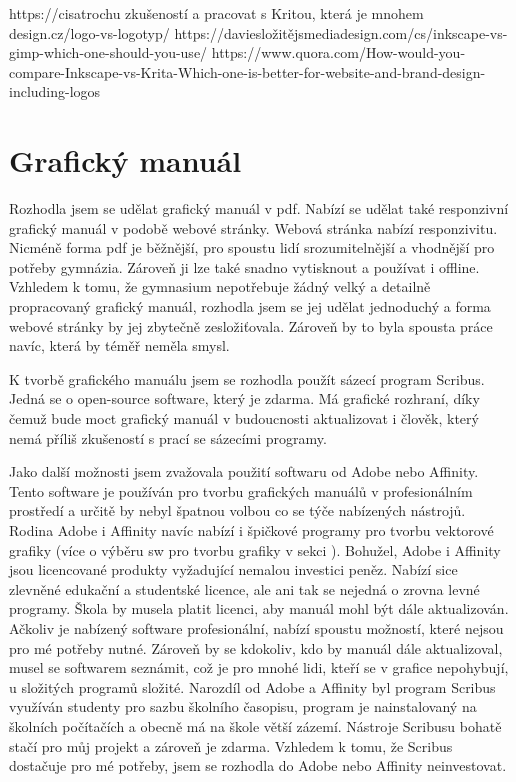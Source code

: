 \documentclass[11pt,a4paper,twoside,openright]{report}
\begin{document}
https://cisatrochu zkušeností a pracovat s Kritou, která je mnohem design.cz/logo-vs-logotyp/
https://daviesložitějsmediadesign.com/cs/inkscape-vs-gimp-which-one-should-you-use/
https://www.quora.com/How-would-you-compare-Inkscape-vs-Krita-Which-one-is-better-for-website-and-brand-design-including-logos

\section{Grafický manuál}
Rozhodla jsem se udělat grafický manuál v pdf. Nabízí se udělat také responzivní grafický manuál v podobě webové stránky. Webová stránka nabízí responzivitu. Nicméně forma pdf je běžnější, pro spoustu lidí srozumitelnější a vhodnější pro potřeby gymnázia. Zároveň ji lze také snadno vytisknout a používat i offline. Vzhledem k tomu, že gymnasium nepotřebuje žádný velký a detailně propracovaný grafický manuál, rozhodla jsem se jej udělat jednoduchý a forma webové stránky by jej zbytečně zesložiťovala. Zároveň by to byla spousta práce navíc, která by téměř neměla smysl.

\label{sec:manual}
K tvorbě grafického manuálu jsem se rozhodla použít sázecí program Scribus. Jedná se o open-source software, který je zdarma. Má grafické rozhraní, díky čemuž bude moct grafický manuál v budoucnosti aktualizovat i člověk, který nemá příliš zkušeností s prací se sázecími programy.

Jako další možnosti jsem zvažovala použití softwaru od Adobe nebo Affinity. Tento software je používán pro tvorbu grafických manuálů v profesionálním prostředí a určitě by nebyl špatnou volbou co se týče nabízených nástrojů. Rodina Adobe i Affinity navíc nabízí i špičkové programy pro tvorbu vektorové grafiky (více o výběru sw pro tvorbu grafiky v sekci ). Bohužel, Adobe i Affinity jsou licencované produkty vyžadující nemalou investici peněz. Nabízí sice zlevněné edukační a studentské licence, ale ani tak se nejedná o zrovna levné programy. Škola by musela platit licenci, aby manuál mohl být dále aktualizován. Ačkoliv je nabízený software profesionální, nabízí spoustu možností, které nejsou pro mé potřeby nutné. Zároveň by se kdokoliv, kdo by manuál dále aktualizoval, musel se softwarem seznámit, což je pro mnohé lidi, kteří se v grafice nepohybují, u složitých programů složité. Narozdíl od Adobe a Affinity byl program Scribus využíván studenty pro sazbu školního časopisu, program je nainstalovaný na školních počítačích a obecně má na škole větší zázemí. Nástroje Scribusu bohatě stačí pro můj projekt a zároveň je zdarma. Vzhledem k tomu, že Scribus dostačuje pro mé potřeby, jsem se rozhodla do Adobe nebo Affinity neinvestovat.
\end{document}
